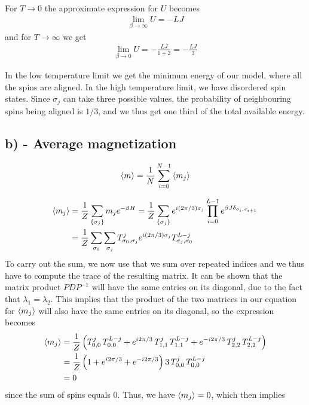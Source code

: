 \documentclass[reprint,english,notitlepage,aps,nobalancelastpage,nofootinbib]{revtex4-1}
\newcommand{\closed}[1]{\left(#1\right)}
\newcommand{\sumstate}{\sum_{\{\sigma_j\}}}
\newcommand{\prodstate}{\prod_{i=0}^{L-1}}
\renewcommand{\l}{\lambda}
\newcommand{\mj}{m_j}
\begin{document}
For $T\to0$ the approximate expression for $U$ becomes 
\begin{align*}
	\lim_{\beta\to\infty} U = -LJ
\end{align*}
and for $T\to\infty$ we get 
\begin{align*}
	\lim_{\beta\to0} U = -\frac{LJ}{1+2}=-\frac{LJ}{3}
\end{align*}

In the low temperature limit we get the minimum energy of our model, where all the spins are aligned. In the high temperature limit, we have disordered spin states. Since $\sigma_j$ can take three possible values, the probability of neighbouring spins being aligned is $1/3$, and we thus get one third of the total available energy.  


\subsection*{b) - Average magnetization}

\begin{align*}
	\expval{m} = \frac{1}{N} \sum_{i=0}^{N-1}\expval{m_j}
\end{align*}


\begin{align*}
	\expval{m_j} &= \frac{1}{Z} \sumstate \mj e^{-\beta H} = \frac{1}{Z} \sumstate e^{i(2\pi/3)\sigma_j} \prodstate e^{\beta J \delta_{\sigma_i,\sigma_{i+1}}} \\ 
	&= \frac{1}{Z} \sum_{\sigma_0} \sum_{\sigma_j} T_{\sigma_0,\sigma_j}^j e^{i(2\pi/3)\sigma_j} T_{\sigma_j,\sigma_0}^{L-j}
\end{align*}
To carry out the sum, we now use that we sum over repeated indices and we thus have to compute the trace of the resulting matrix. It can be shown that the matrix product $PDP^{-1}$ will have the same entries on its diagonal, due to the fact that $\l_1=\l_2$. This implies that the product of the two matrices in our equation for $\expval{\mj}$ will also have the same entries on its diagonal, so the expression becomes
\begin{align*}
	\expval{\mj} &= \frac{1}{Z} \closed{T_{0,0}^j\,T_{0,0}^{L-j} + e^{i2\pi/3} \,T_{1,1}^j\,T_{1,1}^{L-j} + e^{-i2\pi/3}\,T_{2,2}^j\,T_{2,2}^{L-j}} \\ 
	&= \frac{1}{Z} \closed{1 + e^{i2\pi/3} + e^{-i2\pi/3}} 3\,T_{0,0}^{j} \, T_{0,0}^{L-j} \\ 
	&= 0
\end{align*}  
since the sum of spins equals $0$. Thus, we have $\expval{\mj}=0$, which then implies
\end{document}

